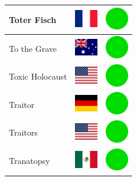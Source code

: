\documentclass[12pt, a4paper, twoside]{report}
\begin{document}
\begin{center}
\begin{longtable}{|p{5cm}|p{2cm}|p{2cm}|}
 Toter Fisch                                                & \includegraphics[width=1cm]{../img/flags/fr} &   \includegraphics[width=1cm]{../likes/y} \\ \hline
 To the Grave                                               & \includegraphics[width=1cm]{../img/flags/au} &   \includegraphics[width=1cm]{../likes/y} \\ \hline
 Toxic Holocaust                                            & \includegraphics[width=1cm]{../img/flags/us} &   \includegraphics[width=1cm]{../likes/y} \\ \hline
 Traitor                                                    & \includegraphics[width=1cm]{../img/flags/de} &   \includegraphics[width=1cm]{../likes/y} \\ \hline
 Traitors                                                   & \includegraphics[width=1cm]{../img/flags/us} &   \includegraphics[width=1cm]{../likes/y} \\ \hline
 Tranatopsy                                                 & \includegraphics[width=1cm]{../img/flags/mx} &   \includegraphics[width=1cm]{../likes/y} \\ \hline

\end{longtable}
\end{center}
\end{document}
